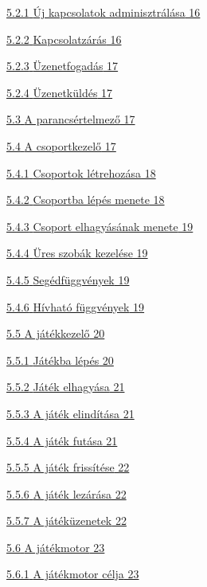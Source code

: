\documentclass[]{article}
\begin{document}
\protect\hyperlink{uxfaj-kapcsolatok-adminisztruxe1luxe1sa}{{5.2.1} {Új
kapcsolatok adminisztrálása} 16}

\protect\hyperlink{kapcsolatzuxe1ruxe1s}{{5.2.2} {Kapcsolatzárás} 16}

\protect\hyperlink{uxfczenetfogaduxe1s}{{5.2.3} {Üzenetfogadás} 17}

\protect\hyperlink{uxfczenetkuxfclduxe9s}{{5.2.4} {Üzenetküldés} 17}

\protect\hyperlink{a-parancsuxe9rtelmezux151}{{5.3} {A parancsértelmező}
17}

\protect\hyperlink{a-csoportkezelux151}{{5.4} {A csoportkezelő} 17}

\protect\hyperlink{csoportok-luxe9trehozuxe1sa}{{5.4.1} {Csoportok
létrehozása} 18}

\protect\hyperlink{csoportba-luxe9puxe9s-menete}{{5.4.2} {Csoportba
lépés menete} 18}

\protect\hyperlink{csoport-elhagyuxe1suxe1nak-menete}{{5.4.3} {Csoport
elhagyásának menete} 19}

\protect\hyperlink{uxfcres-szobuxe1k-kezeluxe9se}{{5.4.4} {Üres szobák
kezelése} 19}

\protect\hyperlink{seguxe9dfuxfcggvuxe9nyek}{{5.4.5} {Segédfüggvények}
19}

\protect\hyperlink{huxedvhatuxf3-fuxfcggvuxe9nyek}{{5.4.6} {Hívható
függvények} 19}

\protect\hyperlink{a-juxe1tuxe9kkezelux151}{{5.5} {A játékkezelő} 20}

\protect\hyperlink{juxe1tuxe9kba-luxe9puxe9s}{{5.5.1} {Játékba lépés}
20}

\protect\hyperlink{juxe1tuxe9k-elhagyuxe1sa}{{5.5.2} {Játék elhagyása}
21}

\protect\hyperlink{a-juxe1tuxe9k-elinduxedtuxe1sa}{{5.5.3} {A játék
elindítása} 21}

\protect\hyperlink{a-juxe1tuxe9k-futuxe1sa}{{5.5.4} {A játék futása} 21}

\protect\hyperlink{a-juxe1tuxe9k-frissuxedtuxe9se}{{5.5.5} {A játék
frissítése} 22}

\protect\hyperlink{a-juxe1tuxe9k-lezuxe1ruxe1sa}{{5.5.6} {A játék
lezárása} 22}

\protect\hyperlink{a-juxe1tuxe9kuxfczenetek}{{5.5.7} {A játéküzenetek}
22}

\protect\hyperlink{a-juxe1tuxe9kmotor}{{5.6} {A játékmotor} 23}

\protect\hyperlink{a-juxe1tuxe9kmotor-cuxe9lja}{{5.6.1} {A játékmotor
célja} 23}
\end{document}
